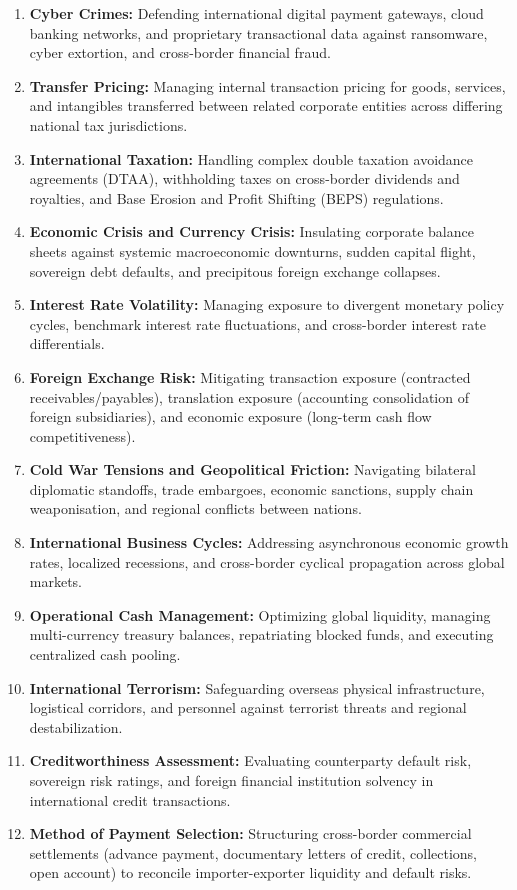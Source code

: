 \begin{enumerate}[leftmargin=*]
    \item \textbf{Cyber Crimes:} Defending international digital payment gateways, cloud banking networks, and proprietary transactional data against ransomware, cyber extortion, and cross-border financial fraud.
    \item \textbf{Transfer Pricing:} Managing internal transaction pricing for goods, services, and intangibles transferred between related corporate entities across differing national tax jurisdictions.
    \item \textbf{International Taxation:} Handling complex double taxation avoidance agreements (DTAA), withholding taxes on cross-border dividends and royalties, and Base Erosion and Profit Shifting (BEPS) regulations.
    \item \textbf{Economic Crisis and Currency Crisis:} Insulating corporate balance sheets against systemic macroeconomic downturns, sudden capital flight, sovereign debt defaults, and precipitous foreign exchange collapses.
    \item \textbf{Interest Rate Volatility:} Managing exposure to divergent monetary policy cycles, benchmark interest rate fluctuations, and cross-border interest rate differentials.
    \item \textbf{Foreign Exchange Risk:} Mitigating transaction exposure (contracted receivables/payables), translation exposure (accounting consolidation of foreign subsidiaries), and economic exposure (long-term cash flow competitiveness).
    \item \textbf{Cold War Tensions and Geopolitical Friction:} Navigating bilateral diplomatic standoffs, trade embargoes, economic sanctions, supply chain weaponisation, and regional conflicts between nations.
    \item \textbf{International Business Cycles:} Addressing asynchronous economic growth rates, localized recessions, and cross-border cyclical propagation across global markets.
    \item \textbf{Operational Cash Management:} Optimizing global liquidity, managing multi-currency treasury balances, repatriating blocked funds, and executing centralized cash pooling.
    \item \textbf{International Terrorism:} Safeguarding overseas physical infrastructure, logistical corridors, and personnel against terrorist threats and regional destabilization.
    \item \textbf{Creditworthiness Assessment:} Evaluating counterparty default risk, sovereign risk ratings, and foreign financial institution solvency in international credit transactions.
    \item \textbf{Method of Payment Selection:} Structuring cross-border commercial settlements (advance payment, documentary letters of credit, collections, open account) to reconcile importer-exporter liquidity and default risks.
\end{enumerate}

